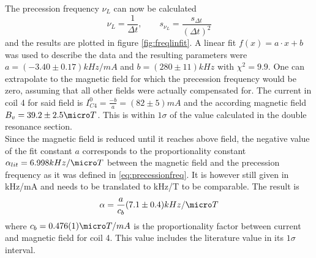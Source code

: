 \newpage
The precession frequency $\nu_L$ can now be calculated
\begin{equation}
\nu_L=\frac{1}{\Delta t},\qquad s_{\nu_L}=\frac{s_{\Delta t}}{(\Delta t)^2}
\end{equation}
and the results are plotted in figure \ref{fig:freqlinfit}. A linear fit $f(x)=a\cdot x+b$ was used to describe the data and the resulting parameters were $a=\unit{(-3.40\pm0.17)}{kHz/mA}$ and $b=\unit{(280\pm11)}{kHz}$ with $\chi^2=9.9$. One can extrapolate to the magnetic field for which the precession frequency would be zero, assuming that all other fields were actually compensated for. The current in coil 4 for said field is $I^0_{C4}=\frac{-b}{a}=\unit{(82\pm5)}{mA}$ and the according magnetic field $B_v=\unit{39.2\pm2.5}{\micro T}$. This is within $1\sigma$ of the value calculated in the double resonance section.\\
Since the magnetic field is reduced until it reaches above field, the negative value of the fit constant $a$ corresponds to the proportionality constant $\alpha_{lit}=\unit{6.998}{kHz/\micro T}$ between the magnetic field and the precession frequency as it was defined in \ref{eq:precessionfreq}. It is however still given in kHz/mA and needs to be translated to kHz/\micro T to be comparable. The result is
\begin{equation}
\alpha=\frac{a}{c_b}\unit{(7.1\pm0.4)}{kHz/\micro T}
\end{equation}
where $c_b=\unit{0.476(1)}{\micro T/mA}$ is the proportionality factor between current and magnetic field for coil 4. This value includes the literature value in its $1\sigma$ interval.
